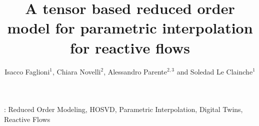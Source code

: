 \documentclass[12pt]{iopart}
\begin{document}
\title{A tensor based reduced order model for parametric interpolation for reactive flows}

\author{Isacco Faglioni$^{1}$, Chiara Novelli$^{2}$, Alessandro Parente$^{2,3}$ and Soledad Le Clainche$^{1}$}

\address{$^{1}$School of Aeronautical and Space Engineering, Universidad Polit\'ecnica de Madrid, Madrid, Spain}
\address{$^{2}$Aero-Thermo-Mechanics Department, Universit\'e Libre de Bruxelles, Brussels, Belgium}
\address{$^{3}$Brussels Institute for Thermal-fluid Systems and Clean Energy (BRITE), ULB and VUB, Belgium}


\begin{abstract}

\end{abstract}

\vspace{2pc}
: Reduced Order Modeling, HOSVD, Parametric Interpolation, Digital Twins, Reactive Flows

\maketitle













\end{document}

